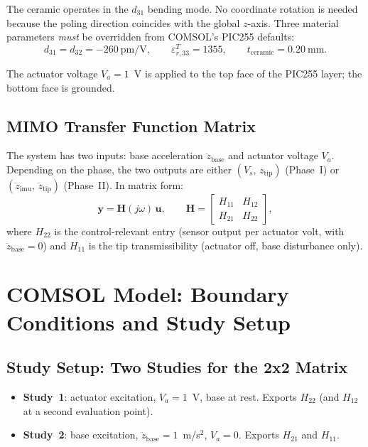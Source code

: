 \documentclass[12pt,a4paper]{article}
\begin{document}
The ceramic operates in the $d_{31}$ bending mode.  No coordinate rotation is
needed because the poling direction coincides with the global $z$-axis.
Three material parameters \emph{must} be overridden from COMSOL's PIC255 defaults:
\begin{equation}
  d_{31} = d_{32} = -260\ \text{pm/V}, \qquad
  \varepsilon_{r,33}^{T} = 1355, \qquad
  t_\text{ceramic} = 0.20\ \text{mm}.
\end{equation}

The actuator voltage $V_a = 1$~V is applied to the top face of the PIC255 layer;
the bottom face is grounded.

\subsection{MIMO Transfer Function Matrix}
\label{sec:mimo}

The system has two inputs: base acceleration $\ddot{z}_\text{base}$ and actuator
voltage $V_a$.  Depending on the phase, the two outputs are either
$(V_s,\, z_\text{tip})$ (Phase~I) or $(\ddot{z}_\text{imu},\, \ddot{z}_\text{tip})$
(Phase~II).  In matrix form:
\begin{equation}
  \mathbf{y} = \mathbf{H}(j\omega)\,\mathbf{u}, \qquad
  \mathbf{H} =
  \begin{bmatrix} H_{11} & H_{12} \\ H_{21} & H_{22} \end{bmatrix},
  \label{eq:mimo}
\end{equation}
where $H_{22}$ is the control-relevant entry (sensor output per actuator volt, with
$\ddot{z}_\text{base}=0$) and $H_{11}$ is the tip transmissibility (actuator off,
base disturbance only).

\section{COMSOL Model: Boundary Conditions and Study Setup}
\label{sec:comsol}

\subsection{Study Setup: Two Studies for the 2x2 Matrix}

\begin{itemize}
  \item \textbf{Study~1}: actuator excitation, $V_a = 1$~V, base at rest.
        Exports $H_{22}$ (and $H_{12}$ at a second evaluation point).
  \item \textbf{Study~2}: base excitation, $\ddot{z}_\text{base} = 1$~m/s$^2$,
        $V_a = 0$.  Exports $H_{21}$ and $H_{11}$.
\end{itemize}
\end{document}

